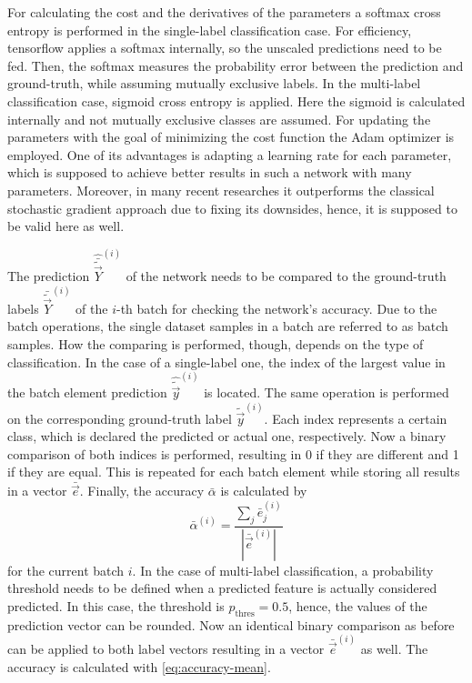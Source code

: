 For calculating the cost and the derivatives of the parameters a softmax cross entropy is performed in the single-label classification case.
For efficiency, tensorflow applies a softmax internally, so the unscaled predictions need to be fed.
Then, the softmax measures the probability error between the prediction and ground-truth, while assuming mutually exclusive labels.
In the multi-label classification case, sigmoid cross entropy is applied.
Here the sigmoid is calculated internally and not mutually exclusive classes are assumed.
For updating the parameters with the goal of minimizing the cost function the Adam optimizer is employed.
One of its advantages is adapting a learning rate for each parameter, which is supposed to achieve better results in such a network with many parameters.
Moreover, in many recent researches it outperforms the classical stochastic gradient approach due to fixing its downsides, hence, it is supposed to be valid here as well.

The prediction $\hat{\bar{\tilde{\vec{Y}}}}^{(i)}$ of the network needs to be compared to the ground-truth labels $\bar{\tilde{\vec{Y}}}^{(i)}$ of the $i$-th batch for checking the network's accuracy.
Due to the batch operations, the single dataset samples in a batch are referred to as batch samples.
How the comparing is performed, though, depends on the type of classification.
In the case of a single-label one, the index of the largest value in the batch element prediction $\hat{\tilde{\vec{y}}}^{(i)}$ is located.
The same operation is performed on the corresponding ground-truth label $\tilde{\vec{y}}^{(i)}$.
Each index represents a certain class, which is declared the predicted or actual one, respectively.
Now a binary comparison of both indices is performed, resulting in 0 if they are different and 1 if they are equal.
This is repeated for each batch element while storing all results in a vector $\bar{\vec{e}}$.
Finally, the accuracy $\bar{\alpha}$ is calculated by
\begin{equation}
	\label{eq:accuracy-mean}
	\bar{\alpha}^{(i)} = \frac{\sum_{j} \bar{e}_j^{(i)}}{|\bar{\vec{e}}^{(i)}|}
\end{equation}
for the current batch $i$.
In the case of multi-label classification, a probability threshold needs to be defined when a predicted feature is actually considered predicted.
In this case, the threshold is $p_{\text{thres}}=0.5$, hence, the values of the prediction vector can be rounded.
Now an identical binary comparison as before can be applied to both label vectors resulting in a vector $\bar{\vec{e}}^{(i)}$ as well.
The accuracy is calculated with \eqref{eq:accuracy-mean}.

